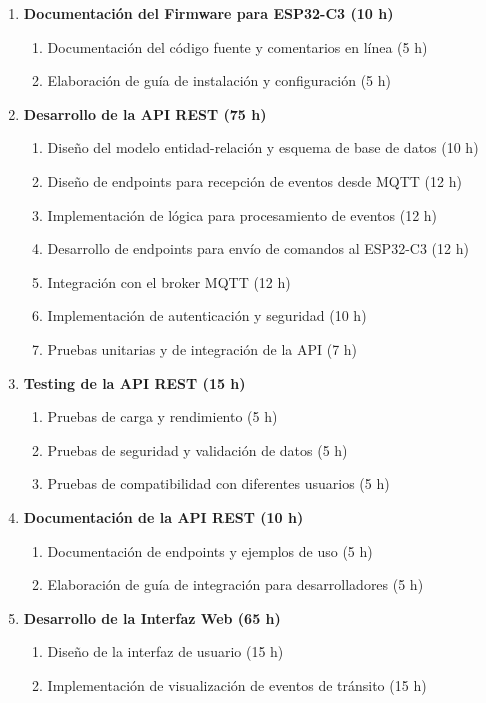 \documentclass[
11pt, %
]{charter}
\begin{document}
\begin{enumerate}
\begin{enumerate}
\end{enumerate}
\item \textbf{Documentación del Firmware para ESP32-C3 (10 h)}
\begin{enumerate}
\item Documentación del código fuente y comentarios en línea (5 h)
\item Elaboración de guía de instalación y configuración (5 h)
\end{enumerate}
\item \textbf{Desarrollo de la API REST (75 h)}
\begin{enumerate}
  \item Diseño del modelo entidad-relación y esquema de base de datos (10 h)
  \item Diseño de endpoints para recepción de eventos desde MQTT (12 h)
  \item Implementación de lógica para procesamiento de eventos (12 h)
  \item Desarrollo de endpoints para envío de comandos al ESP32-C3 (12 h)
  \item Integración con el broker MQTT (12 h)
  \item Implementación de autenticación y seguridad (10 h)
  \item Pruebas unitarias y de integración de la API (7 h)
\end{enumerate}
\item \textbf{Testing de la API REST (15 h)}
\begin{enumerate}
\item Pruebas de carga y rendimiento (5 h)
\item Pruebas de seguridad y validación de datos (5 h)
\item Pruebas de compatibilidad con diferentes usuarios (5 h)
\end{enumerate}
\item \textbf{Documentación de la API REST (10 h)}
\begin{enumerate}
\item Documentación de endpoints y ejemplos de uso (5 h)
\item Elaboración de guía de integración para desarrolladores (5 h)
\end{enumerate}
\item \textbf{Desarrollo de la Interfaz Web (65 h)}
\begin{enumerate}
\item Diseño de la interfaz de usuario (15 h)
\item Implementación de visualización de eventos de tránsito (15 h)

\end{enumerate}
\end{enumerate}
\end{document}
